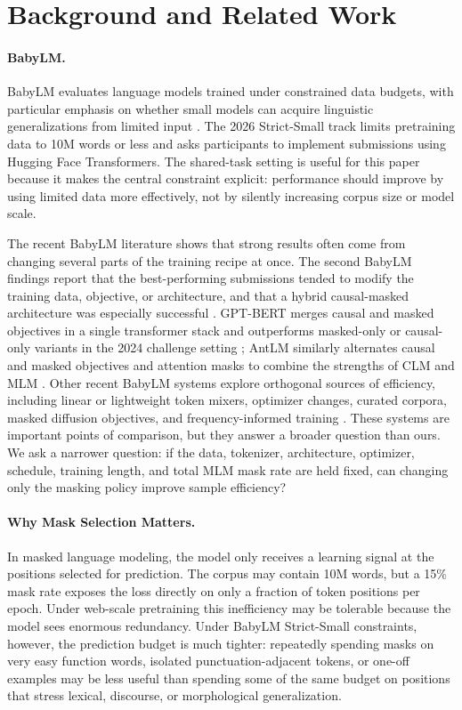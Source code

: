 \section{Background and Related Work}

\paragraph{BabyLM.}
BabyLM evaluates language models trained under constrained data budgets, with particular emphasis on whether small models can acquire linguistic generalizations from limited input \citep{warstadt2023babylm,hu2024babylm,choshen2026babylm}. The 2026 Strict-Small track limits pretraining data to 10M words or less and asks participants to implement submissions using Hugging Face Transformers. The shared-task setting is useful for this paper because it makes the central constraint explicit: performance should improve by using limited data more effectively, not by silently increasing corpus size or model scale.

The recent BabyLM literature shows that strong results often come from changing several parts of the training recipe at once. The second BabyLM findings report that the best-performing submissions tended to modify the training data, objective, or architecture, and that a hybrid causal-masked architecture was especially successful \citep{hu2024babylm}. GPT-BERT merges causal and masked objectives in a single transformer stack and outperforms masked-only or causal-only variants in the 2024 challenge setting \citep{charpentier2024gptbert}; AntLM similarly alternates causal and masked objectives and attention masks to combine the strengths of CLM and MLM \citep{yu2024antlm}. Other recent BabyLM systems explore orthogonal sources of efficiency, including linear or lightweight token mixers, optimizer changes, curated corpora, masked diffusion objectives, and frequency-informed training \citep{haller2025sample,kosmopoulou2025masked}. These systems are important points of comparison, but they answer a broader question than ours. We ask a narrower question: if the data, tokenizer, architecture, optimizer, schedule, training length, and total MLM mask rate are held fixed, can changing only the masking policy improve sample efficiency?

\paragraph{Why Mask Selection Matters.}
In masked language modeling, the model only receives a learning signal at the positions selected for prediction. The corpus may contain 10M words, but a 15\% mask rate exposes the loss directly on only a fraction of token positions per epoch. Under web-scale pretraining this inefficiency may be tolerable because the model sees enormous redundancy. Under BabyLM Strict-Small constraints, however, the prediction budget is much tighter: repeatedly spending masks on very easy function words, isolated punctuation-adjacent tokens, or one-off examples may be less useful than spending some of the same budget on positions that stress lexical, discourse, or morphological generalization.

